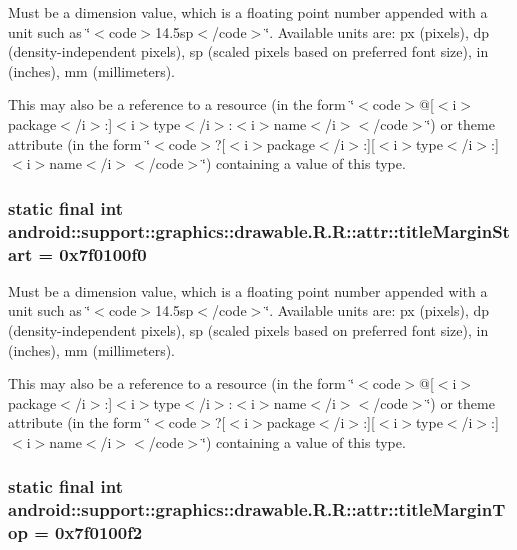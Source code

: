 Must be a dimension value, which is a floating point number appended with a unit such as \char`\"{}$<$code$>$14.5sp$<$/code$>$\char`\"{}. Available units are: px (pixels), dp (density-independent pixels), sp (scaled pixels based on preferred font size), in (inches), mm (millimeters). 

This may also be a reference to a resource (in the form \char`\"{}$<$code$>$@\mbox{[}$<$i$>$package$<$/i$>$:\mbox{]}$<$i$>$type$<$/i$>$:$<$i$>$name$<$/i$>$$<$/code$>$\char`\"{}) or theme attribute (in the form \char`\"{}$<$code$>$?\mbox{[}$<$i$>$package$<$/i$>$:\mbox{]}\mbox{[}$<$i$>$type$<$/i$>$:\mbox{]}$<$i$>$name$<$/i$>$$<$/code$>$\char`\"{}) containing a value of this type. \hypertarget{classandroid_1_1support_1_1graphics_1_1drawable_1_1_r_1_1attr_c370dc8dab6f707ff6c5a751eb03a4fc}{
\subsubsection[{titleMarginStart}]{\setlength{\rightskip}{0pt plus 5cm}static final int android::support::graphics::drawable.R.R::attr::titleMarginStart = 0x7f0100f0}}
\label{classandroid_1_1support_1_1graphics_1_1drawable_1_1_r_1_1attr_c370dc8dab6f707ff6c5a751eb03a4fc}


Must be a dimension value, which is a floating point number appended with a unit such as \char`\"{}$<$code$>$14.5sp$<$/code$>$\char`\"{}. Available units are: px (pixels), dp (density-independent pixels), sp (scaled pixels based on preferred font size), in (inches), mm (millimeters). 

This may also be a reference to a resource (in the form \char`\"{}$<$code$>$@\mbox{[}$<$i$>$package$<$/i$>$:\mbox{]}$<$i$>$type$<$/i$>$:$<$i$>$name$<$/i$>$$<$/code$>$\char`\"{}) or theme attribute (in the form \char`\"{}$<$code$>$?\mbox{[}$<$i$>$package$<$/i$>$:\mbox{]}\mbox{[}$<$i$>$type$<$/i$>$:\mbox{]}$<$i$>$name$<$/i$>$$<$/code$>$\char`\"{}) containing a value of this type. \hypertarget{classandroid_1_1support_1_1graphics_1_1drawable_1_1_r_1_1attr_bbeea2a076224280bee046a63cefd2c5}{
\subsubsection[{titleMarginTop}]{\setlength{\rightskip}{0pt plus 5cm}static final int android::support::graphics::drawable.R.R::attr::titleMarginTop = 0x7f0100f2}}
\label{classandroid_1_1support_1_1graphics_1_1drawable_1_1_r_1_1attr_bbeea2a076224280bee046a63cefd2c5}


